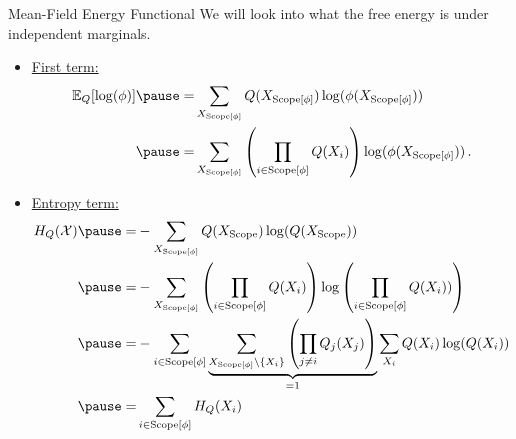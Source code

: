 \begin{frame}{Mean-Field Energy Functional}
We will look into what the free energy is under independent marginals.
    \begin{itemize}
        \pause \item \underline{First term:}
        \begin{equation}
        \begin{aligned}
        \E_{Q}[\log(\phi)] 
        \pause = & \sum_{X_{\Scope[\phi]}} Q(X_{\Scope[\phi]}) \log(\phi(X_{\Scope[\phi]})) \\
        \pause = & \sum_{X_{\Scope[\phi]}} \left(\prod_{i \in \Scope[\phi]} Q(X_i) \right) \log(\phi(X_{\Scope[\phi]}))\,.
        \end{aligned}
        \end{equation}
        \pause \item \underline{Entropy term:}
        \begin{equation}
            \label{eq:entropy-marginal-distribution}
        \begin{aligned}
        H_Q(\mathcal{X}) 
        \pause = & - \sum_{X_{\Scope[\phi]}} Q(X_{\Scope}) \log(Q(X_{\Scope})) \\
        \pause = & - \sum_{X_{\Scope[\phi]}} \left(\prod_{i \in \Scope[\phi]} Q(X_i) \right) \log \left(\prod_{i \in \Scope[\phi]} Q(X_i)) \right) \\
        \pause = & - \sum_{i \in \Scope[\phi]} \underbrace{\sum_{X_{\Scope[\phi]} \backslash \{X_i\}} \left( \prod_{j \neq i} Q_j(X_j) \right)}_{=1} \sum_{X_i} Q(X_i) \log(Q(X_i)) \\
        \pause = & \sum_{i \in \Scope[\phi]} H_Q(X_i)
        \end{aligned}
        \end{equation}
    \end{itemize}
\end{frame}

